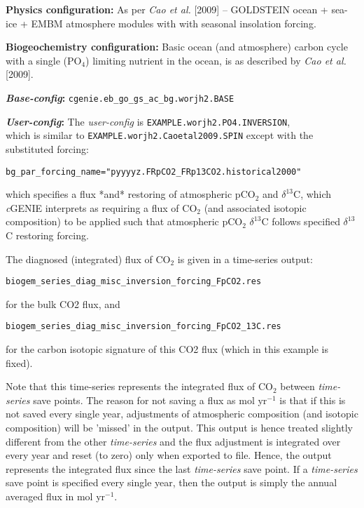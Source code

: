 \documentclass[10pt,twoside]{article}
\begin{document}
\noindent \textbf{Physics configuration:} As per \textit{Cao et al.} [2009] -- GOLDSTEIN ocean + sea-ice + EMBM atmosphere modules with with seasonal insolation forcing.

\noindent \textbf{Biogeochemistry configuration:} Basic ocean (and atmosphere) carbon cycle with a single (PO$_{4}$) limiting nutrient in the ocean, is as described by \textit{Cao et al.} [2009].

\noindent \textbf{\textit{Base-config}:} \texttt{cgenie.eb\_go\_gs\_ac\_bg.worjh2.BASE}

\noindent \textbf{\textit{User-config}:} The \textit{user-config} is \texttt{EXAMPLE.worjh2.PO4.INVERSION},
\\ which is similar to \texttt{EXAMPLE.worjh2.Caoetal2009.SPIN} except with the substituted forcing:

\vspace{-10pt}\begin{verbatim}
bg_par_forcing_name="pyyyyz.FRpCO2_FRp13CO2.historical2000"
\end{verbatim}\vspace{-10pt}

\noindent which specifies a flux *and* restoring of atmospheric pCO$_{2}$ and $\delta^{13}$C, which \textit{c}GENIE interprets as requiring a flux of CO$_{2}$ (and associated isotopic composition) to be applied such that atmospheric pCO$_{2}$ $\delta^{13}$C follows specified $\delta^{13}$C restoring forcing.

The diagnosed (integrated) flux of CO$_{2}$ is given in a time-series output:
\vspace{-10pt}\begin{verbatim}
biogem_series_diag_misc_inversion_forcing_FpCO2.res
\end{verbatim}\vspace{-10pt}
for the bulk CO2 flux, and
\vspace{-10pt}\begin{verbatim}
biogem_series_diag_misc_inversion_forcing_FpCO2_13C.res
\end{verbatim}\vspace{-10pt}
for the carbon isotopic signature of this CO2 flux (which in this example is fixed).

Note that this time-series represents the integrated flux of CO$_{2}$ between \textit{time-series} save points. The reason for not saving a flux as mol yr$^{-1}$ is that if this is not saved every single year, adjustments of atmospheric composition (and isotopic composition) will be 'missed' in the output. This output is hence treated slightly different from the other \textit{time-series} and the flux adjustment is integrated over every year and reset (to zero) only when exported to file. Hence, the output represents the integrated flux since the last \textit{time-series} save point. If a \textit{time-series} save point is specified every single year, then the output is simply the annual averaged flux in mol yr$^{-1}$.
\end{document}
